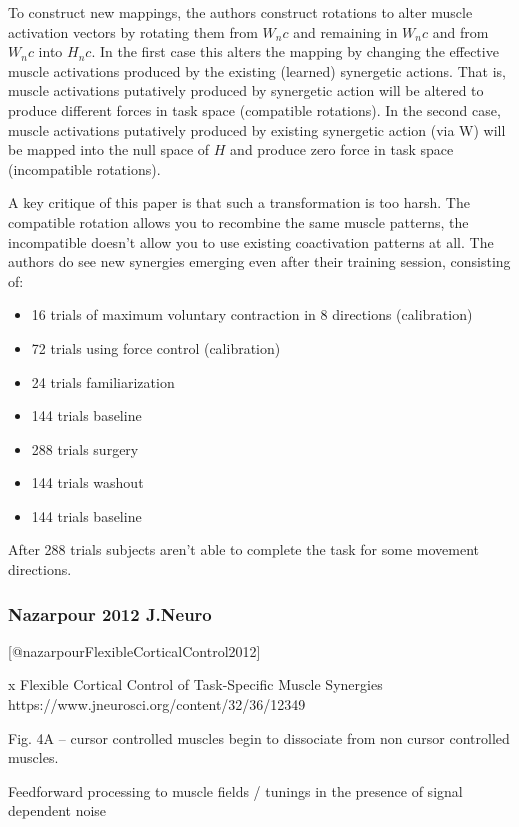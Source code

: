 To construct new mappings, the authors construct rotations to alter
muscle activation vectors by rotating them from \(W_nc\) and remaining
in \(W_nc\) and from \(W_nc\) into \(H_nc\). In the first case this
alters the mapping by changing the effective muscle activations produced
by the existing (learned) synergetic actions. That is, muscle
activations putatively produced by synergetic action will be altered to
produce different forces in task space (compatible rotations). In the
second case, muscle activations putatively produced by existing
synergetic action (via W) will be mapped into the null space of \(H\)
and produce zero force in task space (incompatible rotations).

A key critique of this paper is that such a transformation is too harsh.
The compatible rotation allows you to recombine the same muscle
patterns, the incompatible doesn't allow you to use existing
coactivation patterns at all. The authors do see new synergies emerging
even after their training session, consisting of:

\begin{itemize}
\tightlist
\item
  16 trials of maximum voluntary contraction in 8 directions
  (calibration)
\item
  72 trials using force control (calibration)
\item
  24 trials familiarization
\item
  144 trials baseline
\item
  288 trials surgery
\item
  144 trials washout
\item
  144 trials baseline
\end{itemize}

After 288 trials subjects aren't able to complete the task for some
movement directions.

\subsubsection{Nazarpour 2012 J.Neuro}\label{nazarpour-2012-j.neuro}

{[}@nazarpourFlexibleCorticalControl2012{]}

x Flexible Cortical Control of Task-Specific Muscle Synergies
https://www.jneurosci.org/content/32/36/12349

Fig. 4A -- cursor controlled muscles begin to dissociate from non cursor
controlled muscles.

Feedforward processing to muscle fields / tunings in the presence of
signal dependent noise

